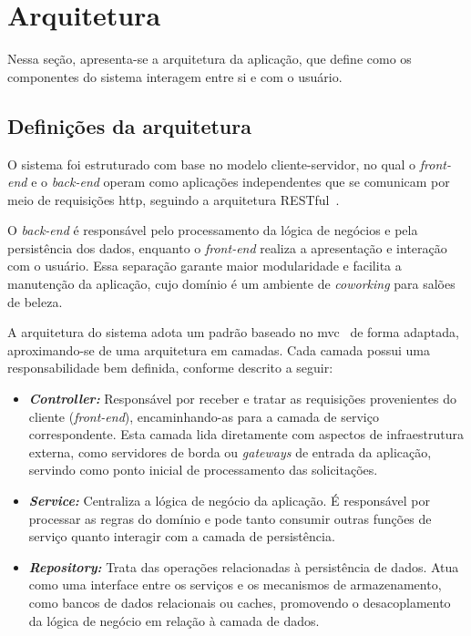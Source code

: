 \section{Arquitetura}

Nessa seção, apresenta-se a arquitetura da aplicação, que define como os componentes do sistema interagem entre si e com o usuário.

\subsection{Definições da arquitetura}

O sistema foi estruturado com base no modelo cliente-servidor, no qual o \emph{front-end} e o \emph{back-end} operam como aplicações independentes que se comunicam por meio de requisições \gls{http}, seguindo a arquitetura RESTful~\cite{RESTArch}.

O \emph{back-end} é responsável pelo processamento da lógica de negócios e pela persistência dos dados, enquanto o \emph{front-end} realiza a apresentação e interação com o usuário. Essa separação garante maior modularidade e facilita a manutenção da aplicação, cujo domínio é um ambiente de \textit{coworking} para salões de beleza.

A arquitetura do sistema adota um padrão baseado no \gls{mvc}~\cite{MDNMVC} de forma adaptada, aproximando-se de uma arquitetura em camadas. Cada camada possui uma responsabilidade bem definida, conforme descrito a seguir:

\begin{itemize}
  \item \textbf{\emph{Controller:}} Responsável por receber e tratar as requisições provenientes do cliente (\emph{front-end}), encaminhando-as para a camada de serviço correspondente. Esta camada lida diretamente com aspectos de infraestrutura externa,  como servidores de borda ou \emph{gateways} de entrada da aplicação, servindo como ponto inicial de processamento das solicitações.
  \item \textbf{\emph{Service:}} Centraliza a lógica de negócio da aplicação. É responsável por processar as regras do domínio e pode tanto consumir outras funções de serviço quanto interagir com a camada de persistência.
  \item \textbf{\emph{Repository:}} Trata das operações relacionadas à persistência de dados. Atua como uma interface entre os serviços e os mecanismos de armazenamento, como bancos de dados relacionais ou caches, promovendo o desacoplamento da lógica de negócio em relação à camada de dados.
\end{itemize}


